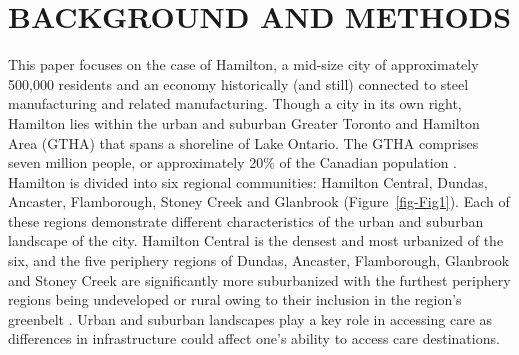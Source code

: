 \documentclass[
  super,
  preprint,
  3p]{elsarticle}
\begin{document}
\hypertarget{background-and-methods}{%
\section{BACKGROUND AND METHODS}\label{background-and-methods}}

This paper focuses on the case of Hamilton, a mid-size city of
approximately 500,000 residents and an economy historically (and still)
connected to steel manufacturing and related manufacturing. Though a
city in its own right, Hamilton lies within the urban and suburban
Greater Toronto and Hamilton Area (GTHA) that spans a shoreline of Lake
Ontario. The GTHA comprises seven million people, or approximately 20\%
of the Canadian population
\citep{cityoftoronto2021CensusPopulationa2022}. Hamilton is divided into
six regional communities: Hamilton Central, Dundas, Ancaster,
Flamborough, Stoney Creek and Glanbrook (Figure~\ref{fig-Fig1}). Each of
these regions demonstrate different characteristics of the urban and
suburban landscape of the city. Hamilton Central is the densest and most
urbanized of the six, and the five periphery regions of Dundas,
Ancaster, Flamborough, Glanbrook and Stoney Creek are significantly more
suburbanized with the furthest periphery regions being undeveloped or
rural owing to their inclusion in the region's greenbelt
\citep{greenbeltfoundationThrivingGreenbeltThrivingNA}. Urban and
suburban landscapes play a key role in accessing care as differences in
infrastructure could affect one's ability to access care destinations.
\end{document}
